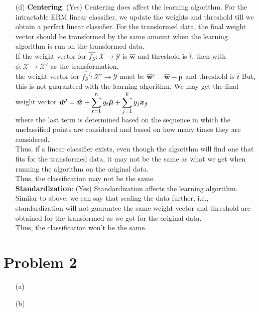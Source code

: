 \documentclass[fleqn]{article}
\begin{document}
\begin{itemize}
        \item[(d)]
		\textbf{Centering}: (Yes) Centering does affect the learning algorithm.
		For the intractable ERM linear classifier, we update the weights and threshold till we obtain a perfect linear classifier.
		For the transformed data, the final weight vector should be transformed by the same amount when the learning algorithm
		is run on the transformed data. \\
		If the weight vector for $\hat{f_S}: \mathcal{X} \rightarrow \mathcal{Y}$ 
		is $\bm{\hat{w}}$ and threshold is $\hat{t}$, then with $\phi: \mathcal{X} \rightarrow \mathcal{X'}$ as the transformation, \\
		the weight vector for $\hat{f_S'}: \mathcal{X'} \rightarrow \mathcal{Y}$ 
		must be $\bm{\hat{w}'} = \bm{\hat{w}} - \bm{\hat{\mu}}$ and threshold is $\hat{t}$
		But, this is not guaranteed with the learning algorithm.
		We may get the final weight vector $\bm{\hat{w}'} = \bm{\hat{w}} 
						+ \smashoperator{\sum_{t = 1}^{n}} y_t \bm{\hat{\mu}}
						+ \smashoperator{\sum_{j = 1}^{k}} y_j \bm{x_j} $\\
		where the last term is determined based on the sequence in which the unclassified points are considered
		and based on how many times they are considered. \\
		Thus, if a linear classifier exists, even though the algorithm will find one that fits for the transformed data,
		it may not be the same as what we get when running the algorithm on the original data.\\
		Thus, the classification may not be the same.\\

		\textbf{Standardization}: (Yes) Standardization affects the learning algorithm.
		Similar to above, we can say that scaling the data further, i.e., standardization will not guarantee the
		same weight vector and threshold are obtained for the transformed as we got for the original data.\\
		Thus, the classification won't be the same.\\

\end{itemize}
\section{Problem 2}{}
\begin{itemize}
	\item[(a)] 
        \item[(b)] 
\end{itemize}
\end{document}
